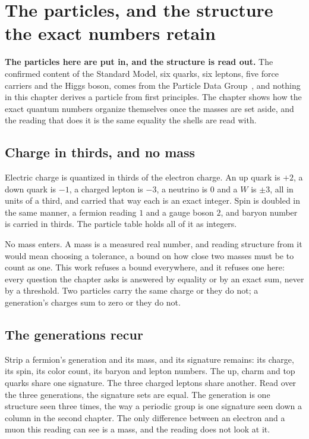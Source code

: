 \chapter{The particles, and the structure the exact numbers retain}

\textbf{The particles here are put in, and the structure is read out.} The confirmed content of the
Standard Model, six quarks, six leptons, five force carriers and the Higgs boson, comes from the
Particle Data Group~\cite{src:Particle-Data-Group}, and nothing in this chapter derives a particle from
first principles. The chapter shows how the exact quantum numbers organize themselves once
the masses are set aside, and the reading that does it is the same equality the shells are read with.

\section{Charge in thirds, and no mass}

Electric charge is quantized in thirds of the electron charge. An up quark is $+2$, a down quark is
$-1$, a charged lepton is $-3$, a neutrino is $0$ and a $W$ is $\pm 3$, all in units of a third, and
carried that way each is an exact integer. Spin is doubled in the same manner, a fermion reading $1$
and a gauge boson $2$, and baryon number is carried in thirds. The particle table holds all of it as
integers.

No mass enters. A mass is a measured real number, and reading structure from it would mean choosing a
tolerance, a bound on how close two masses must be to count as one. This work refuses a bound
everywhere, and it refuses one here: every question the chapter asks is answered by equality or by an
exact sum, never by a threshold. Two particles carry the same charge or they do not; a generation's
charges sum to zero or they do not.

\section{The generations recur}

Strip a fermion's generation and its mass, and its signature remains: its charge, its spin, its
color count, its baryon and lepton numbers. The up, charm and top quarks share one signature. The
three charged leptons share another. Read over the three generations, the signature sets are equal.
The generation is one structure seen three times, the way a periodic group is one signature seen down
a column in the second chapter. The only difference between an electron and a muon this reading can
see is a mass, and the reading does not look at it.

